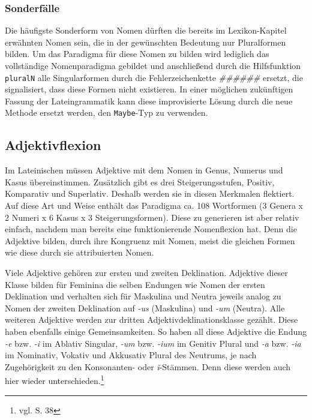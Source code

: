 \subsubsection{Sonderfälle}
Die häufigste Sonderform von Nomen dürften die bereits im Lexikon-Kapitel erwähnten Nomen sein, die in der gewünschten Bedeutung nur Pluralformen bilden. Um das Paradigma für diese Nomen zu bilden wird lediglich das vollständige Nomenparadigma gebildet und anschließend durch die Hilfsfunktion \texttt{pluralN} alle Singularformen durch die Fehlerzeichenkette \textit{\#\#\#\#\#\#} ersetzt, die signalisiert, dass diese Formen nicht existieren. In einer möglichen zukünftigen Fassung der Lateingrammatik kann diese improvisierte Lösung durch die neue Methode ersetzt werden, den \texttt{Maybe}-Typ zu verwenden.
\subsection{Adjektivflexion}
\label{subsec:adjektiv}
Im Lateinischen müssen Adjektive mit dem Nomen in Genus, Numerus und Kasus übereinstimmen. Zusätzlich gibt es drei Steigerungsstufen, Positiv, Komparativ und Superlativ. Deshalb werden sie in diesen Merkmalen flektiert. Auf diese Art und Weise enthält das Paradigma ca. 108 Wortformen (3 Genera x 2 Numeri x 6 Kasus x 3 Steigerungsformen). Diese zu generieren ist aber relativ einfach, nachdem man bereits eine funktionierende Nomenflexion hat. Denn die Adjektive bilden, durch ihre Kongruenz mit Nomen, meist die gleichen Formen wie diese durch sie attribuierten Nomen. \par
Viele Adjektive gehören zur ersten und zweiten Deklination. Adjektive dieser Klasse bilden für Feminina die selben Endungen wie Nomen der ersten Deklination und verhalten sich für Maskulina und Neutra jeweils analog zu Nomen der zweiten Deklination auf \textit{-us} (Maskulina) und \textit{-um} (Neutra). Alle weiteren Adjektive werden zur dritten Adjektivdeklinationsklasse gezählt. Diese haben ebenfalls einige Gemeinsamkeiten. So haben all diese Adjektive die Endung \textit{-e} bzw. \textit{-i} im Ablativ Singular, \textit{-um} bzw. \textit{-ium} im Genitiv Plural und \textit{-a} bzw. \textit{-ia} im Nominativ, Vokativ und Akkusativ Plural des Neutrums, je nach Zugehörigkeit zu den Konsonanten- oder \textit{ǐ}-Stämmen. Denn diese werden auch hier wieder unterschieden.\footnote{vgl. \cite{BAYER-LINDAUER1994} S. 38} \par
